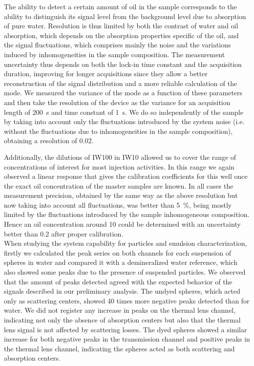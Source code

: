\documentclass[9pt,twocolumn,twoside]{osajnl}
\begin{document}
The ability to detect a certain amount of oil in the sample corresponds to the ability to distinguish its signal level from the background level due to absorption of pure water. Resolution is thus limited by both the contrast of water and oil absorption, which depends on the absorption properties specific of the oil, and the signal fluctuations, which comprises mainly the noise and the variations induced by inhomogeneities in the sample composition. The measurement uncertainty thus depends on both the lock-in time constant and the acquisition duration, improving for longer acquisitions since they allow a better reconstruction of the signal distribution and a more reliable calculation of the mode. We measured the variance of the mode as a function of these parameters and then take the resolution of the device as the variance for an acquisition length of \SI{200}{\s} and time constant of \SI{1}{\s}. We do so independently of the sample by taking into account only the fluctuations introduced by the system noise (i.e. without the fluctuations due to inhomogeneities in the sample composition), obtaining a resolution of \SI{0.02}{\ppm}.

Additionally, the dilutions of IW100 in IW10 allowed us to cover the range of concentrations of interest for most injection activities. In this range we again observed a linear response that gives the calibration coefficients for this well once the exact oil concentration of the master samples are known. In all cases the measurement precision, obtained by the same way as the above resolution but now taking into account all fluctuations, was better than \SI{5}{\percent}, being mostly limited by the fluctuations introduced by the sample inhomogeneous composition. Hence an oil concentration around \SI{10}{\ppm} could be determined with an uncertainty better than \SI{0.2}{\ppm} after proper calibration. \\

When studying the system capability for particles and emulsion characterization, firstly we calculated the peak series on both channels for each suspension of spheres in water and compared it with a demineralized water reference, which also showed some peaks due to the presence of suspended particles. We observed that the amount of peaks detected agreed with the expected behavior of the signals described in our preliminary analysis. The undyed spheres, which acted only as scattering centers, showed \SI{40}{} times more negative peaks detected than for water. We did not register any increase in peaks on the thermal lens channel, indicating not only the absence of absorption centers but also that the thermal lens signal is not affected by scattering losses. The dyed spheres showed a similar increase for both negative peaks in the transmission channel and positive peaks in the thermal lens channel, indicating the spheres acted as both scattering and absorption centers.
\end{document}
